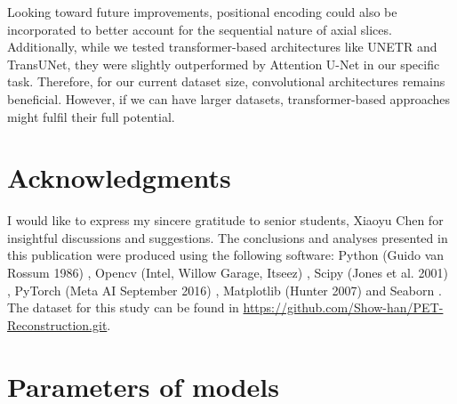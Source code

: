 \documentclass[12pt]{iopart}
\begin{document}
Looking toward future improvements, positional encoding could also be incorporated to better account for the sequential nature of axial slices. Additionally, while we tested transformer-based architectures like UNETR and TransUNet, they were slightly outperformed by Attention U-Net in our specific task. 
Therefore, for our current dataset size, convolutional architectures remains beneficial. However, if we can have larger datasets, transformer-based approaches might fulfil their full potential.




\section{Acknowledgments}
I would like to express my sincere gratitude to senior students, Xiaoyu Chen for insightful discussions and suggestions.
The conclusions and analyses presented in this publication were produced using the following software: Python (Guido van Rossum 1986) \cite{10.5555/1593511}, Opencv (Intel, Willow Garage, Itseez) \cite{itseez2015opencv}, Scipy (Jones et al. 2001) \cite{2020SciPy-NMeth}, PyTorch  (Meta AI September 2016) \cite{NEURIPS2019_9015}, Matplotlib (Hunter 2007) \cite{Hunter:2007} and Seaborn \cite{Waskom2021}.
The dataset for this study can be found in \url{https://github.com/Show-han/PET-Reconstruction.git}.
\appendix

\section{Parameters of models}
\label{sec:appendix}
\end{document}
